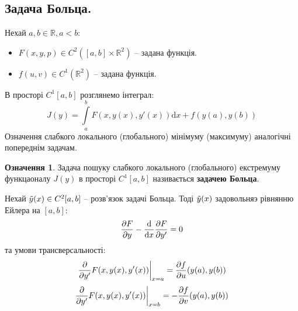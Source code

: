 \documentclass[14pt,a4paper]{scrartcl}
\theoremstyle{definition}
\newtheorem*{defo}{Означення}
\theoremstyle{definition}
\theoremstyle{definition}
\begin{document}
 \subsection{Задача Больца.}
 Нехай $a,b \in \mathbb{R}, a < b$:
 \begin{itemize}
   \item $F(x,y,p) \in C^2([a,b] \times \mathbb{R}^2)$ -- задана функція.
   \item $f(u,v) \in C^1 (\mathbb{R}^2)$ -- задана функція.
 \end{itemize}
 В просторі $C^1[a,b]$ розглянемо інтеграл:
 $$
 J(y) =  \int\limits_{a}^{b}{F(x,y(x), y'(x))} \mathrm{d} x + f(y(a), y(b))
 $$
Означення слабкого локального (глобального) мінімуму (максимуму) аналогічні попереднім задачам.
\begin{defo}
 Задача пошуку слабкого локального (глобального) екстремуму функцаоналу $J(y)$ в просторі $C^1 [a,b]$ називається \textbf{задачею Больца}.
\end{defo}
\begin{boxteo}
Нехай $\tilde{y} (x) \in C^2  [a,b]$  -- розв'язок задачі Больца. Тоді $\tilde{y}(x)$ задовольняэ рівнянню Ейлера на $[a,b]$:
$$
\frac{\partial F}{ \partial y} - \frac{\mathrm{d}}{\mathrm{d} x} \frac{\partial F}{\partial y'} = 0
$$
та умови трансверсальності:
$$
\frac{\partial }{\partial y'} F (x, y(x), y'(x)) \bigg|_{x = a}  = \frac{\partial f}{\partial u} (y(a), y(b))
$$
$$
\frac{\partial }{\partial y'} F (x, y(x), y'(x)) \bigg|_{x = b}  = -\frac{\partial f}{\partial v} (y(a), y(b))
$$
\end{boxteo}
\end{document}
